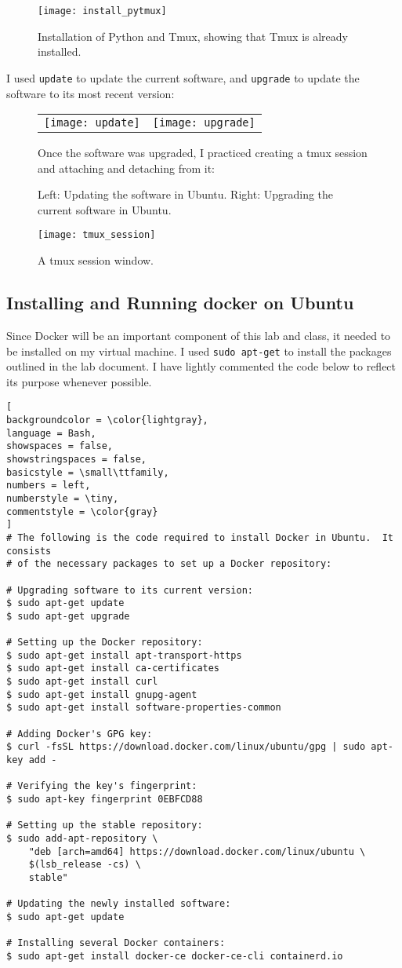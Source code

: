 \documentclass[]{article}
\newcommand{\code}[1]{\colorbox{light-gray}{\texttt{#1}}}
\begin{document}
\begin{figure}[!h]
	\texttt{[image: install\_pytmux]}
	\caption{Installation of Python and Tmux, showing that Tmux is already installed.}
	\label{Fig:Race}
\end{figure}
I used \code{update} to update the current software, and \code{upgrade} to update the software to its most recent version: 
\pagebreak
\begin{figure}[!h]
	\begin{tabular}{ll}
		\texttt{[image: update]}
		&
		\texttt{[image: upgrade]}
	\end{tabular}
	\caption{Left: Updating the software in Ubuntu.  Right: Upgrading the current software in Ubuntu.}
	\label{Fig:Race}
	
Once the software was upgraded, I practiced creating a tmux session and attaching and detaching from it:

	\end{figure}
	\begin{figure}[!h]
	\texttt{[image: tmux\_session]}
	\caption{A tmux session window.}
	\label{Fig:Race}
\end{figure}
\subsection{Installing and Running docker on Ubuntu}
Since Docker will be an important component of this lab and class, it needed to be installed on my virtual machine.  I used \code{sudo apt-get} to install the packages outlined in the lab document.  I have lightly commented the code below to reflect its purpose whenever possible.

\begin{lstlisting}[
backgroundcolor = \color{lightgray},
language = Bash,
showspaces = false,
showstringspaces = false,
basicstyle = \small\ttfamily,
numbers = left,
numberstyle = \tiny,
commentstyle = \color{gray}
]
# The following is the code required to install Docker in Ubuntu.  It consists
# of the necessary packages to set up a Docker repository:

# Upgrading software to its current version:
$ sudo apt-get update
$ sudo apt-get upgrade

# Setting up the Docker repository:
$ sudo apt-get install apt-transport-https
$ sudo apt-get install ca-certificates
$ sudo apt-get install curl
$ sudo apt-get install gnupg-agent
$ sudo apt-get install software-properties-common

# Adding Docker's GPG key:
$ curl -fsSL https://download.docker.com/linux/ubuntu/gpg | sudo apt-key add -

# Verifying the key's fingerprint:
$ sudo apt-key fingerprint 0EBFCD88

# Setting up the stable repository:
$ sudo add-apt-repository \
	"deb [arch=amd64] https://download.docker.com/linux/ubuntu \
	$(lsb_release -cs) \ 
	stable"
	
# Updating the newly installed software:
$ sudo apt-get update

# Installing several Docker containers:
$ sudo apt-get install docker-ce docker-ce-cli containerd.io

\end{lstlisting}
\end{document}
